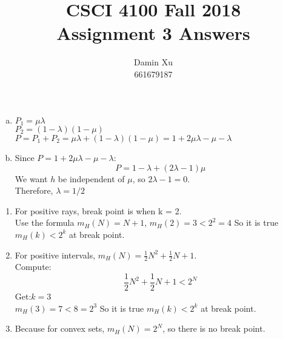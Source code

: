 \documentclass[11pt]{article}
\title{CSCI 4100 Fall 2018 \\
Assignment 3 Answers}
\author{Damin Xu\\661679187}
\begin{document}
\maketitle

\begin{enumerate} [(a)]
	\item $P_1=\mu \lambda $\\
	$P_2=(1-\lambda)(1-\mu)$\\
	$P=P_1+P_2=\mu \lambda+(1-\lambda)(1-\mu)=1+2\mu\lambda-\mu-\lambda$
	\item Since $P=1+2\mu\lambda-\mu-\lambda$:
	\[
	P=1-\lambda+(2\lambda-1)\mu
	\]
	We want $h$ be independent of $\mu$, so $2\lambda-1 = 0$.\\
	Therefore, $\lambda=1/2$
\end{enumerate}

\begin{enumerate} [(1)]
\item For positive rays, break point is when k = 2.\\
Use the formula $m_H(N) = N+1$, $m_H(2)=3<2^2=4$
So it is true $m_H(k)<2^k$ at break point.

\item For positive intervals, $m_H(N)=\frac{1}{2} N^2+\frac{1}{2} N+1$.\\
Compute:
\[
\frac{1}{2} N^2+\frac{1}{2} N+1 < 2^N
\]
Get:$k=3$\\
$m_H(3)=7<8=2^3$
So it is true $m_H(k)<2^k$ at break point.

\item Because for convex sets, $m_H(N)=2^N$, so there is no break point.
\end{enumerate}
\newpage
\end{document}
